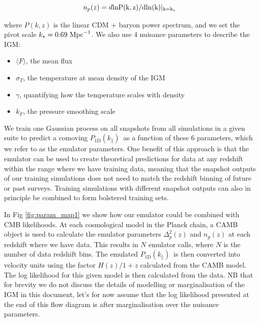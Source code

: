 \documentclass[preprintnumbers,prd,superscriptaddress,notitlepage,nofootinbib] {revtex4-1}
\newcommand{\afr}[1]{{\color{red}AFR: #1}}
\newcommand{\fluxpower}{$P_\mathrm{1D}(k_\parallel)$}
\begin{document}

\begin{equation}
    \label{eq:n_p}
    n_p(z)=d\rm{ln}P(k,z) / d \rm{ln}(k)|_{k=k_\star}
\end{equation}

where $P(k,z)$ is the linear CDM + baryon power spectrum, and we set the pivot
scale $k_\star=0.69 \ \text{Mpc}^{-1}$. We also use $4$ nuisance parameters
to describe the IGM:

\begin{itemize}
    \item $\langle F \rangle$, the mean flux
    \item $\sigma_T$, the temperature at mean density of the IGM
    \item $\gamma$, quantifying how the temperature scales with density
    \item $k_F$, the pressure smoothing scale
\end{itemize}

We train one Gaussian
process on all snapshots from all simulations in a given suite to predict a
comoving \fluxpower\ as a function of these $6$ parameters, which we refer to as the
emulator parameters. One benefit of this approach is that the emulator can be used
to create theoretical predictions for data at any redshift within the range where
we have training data, meaning that the snapshot outputs of our training simulations
does not need to match the redshift binning of future or past surveys.
Training simulations with different snapshot outputs can also in principle be combined
to form bolstered training sets.

In Fig \ref{fig:param_map1} we show how our emulator could be combined with
CMB likelihoods. At each cosmological model in the Planck chain, a \textsc{CAMB}
object is used to calculate the emulator parameters $\Delta^2_p(z)$ and $n_p(z)$
at each redshift where we have data. This results in $N$ emulator calls, where $N$
is the number of data redshift bins. The emulated \fluxpower\ is then converted
into velocity units using the factor $H(z)/1+z$ calculated from
the \textsc{CAMB} model. The log likelihood for this given model is then calculated
from the data. NB that for brevity we do not discuss the details of modelling or
marginalisation of the IGM in this document, let's for now assume that the log
likelihood presented at the end of this flow diagram is after marginalisation
over the nuisance parameters.
\end{document}
